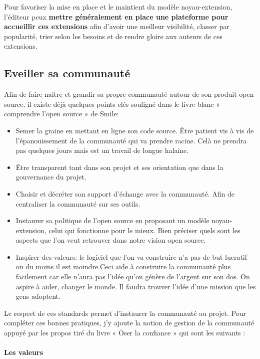 				Pour favoriser la mise en place et le maintient du modèle noyau-extension, l'éditeur peux \textbf{mettre généralement en place une plateforme pour accueillir ces extensions} afin d'avoir une meilleur visibilité, classer par popularité, trier selon les besoins et de rendre gloire aux auteurs de ces extensions.
			
		\subsection{Eveiller sa communauté}

			Afin de faire naitre et grandir sa propre communauté autour de son produit open source, il existe déjà quelques points clés souligné dans le livre blanc « comprendre l'open source » de Smile:

			\begin{itemize}[label=\textbullet, font=\LARGE \color{burntorange}]
				\item Semer la graine en mettant en ligne son code source. Être patient vis à vis de l'épanouissement de la communauté qui va prendre racine. Celà ne prendra pas quelques jours mais est un travail de longue halaine.
				\item Être transparent tant dans son projet et ses orientation que dans la gouvernance du projet.
				\item Choisir et décréter son support d'échange avec la communauté. Afin de centraliser la communauté sur ses outils.
				\item Instaurer sa politique de l'open source en proposant un modèle noyau-extension, celui qui fonctionne pour le mieux. Bien préciser quels sont les aspects que l'on veut retrouver dans notre vision open source.
				\item Inspirer des valeurs: le logiciel que l'on va construire n'a pas de but lucratif ou du moins il est moindre.Ceci aide à construire la communauté plus facilement car elle n'aura pas l'idée qu'on génère de l'argent sur son dos. On aspire à aider, changer le monde. Il faudra trouver l'idée d'une mission que les gens adoptent.
			\end{itemize}

			Le respect de ces standards permet d'instaurer la communauté au projet. Pour compléter ces bonnes pratiques, j'y ajoute la notion de gestion de la communauté appuyé par les propos tiré du livre « Oser la confiance » qui sont les suivants :

			\paragraph{Les valeurs}

